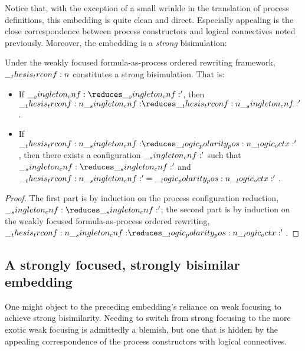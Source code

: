 Notice that, with the exception of a small wrinkle in the translation of process definitions, this embedding is quite clean and direct.
Especially appealing is the close correspondence between process constructors and logical connectives noted previously.
%
Moreover, the embedding is a \emph{strong} bisimulation:
%
\begin{theorem}
  Under the weakly focused formula-as-pro\-cess ordered rewriting framework, $\__thesis_trconf:n {}$ constitutes a strong bisimulation.
  That is:
  \begin{itemize}[nosep]
  \item If\/ $\cnf \reduces \cnf'$, then $\trconf{\cnf} \reduces \trconf{\cnf'}$.
  \item If\/ $\trconf{\cnf} \reduces \p{\octx'{}}$, then there exists a configuration $\__singleton_cnf:'$ such that $\cnf \reduces \cnf'$ and $\__thesis_trconf:n {\__singleton_cnf:'} = \__logic_polarity_pos:n {\__logic_octx:'{}}$.
  \end{itemize}
\end{theorem}
\begin{proof}
  The first part is by induction on the process configuration reduction, $\cnf \reduces \cnf'$; the second part is by induction on the weakly focused formula-as-process ordered rewriting, $\trconf{\cnf} \reduces \p{\octx'{}}$.
\end{proof}

\subsection{A strongly focused, strongly bisimilar embedding}\label{sec:embed:strong-focused-strong-bisim}

One might object to the preceding embedding's reliance on weak focusing to achieve strong bisimilarity.
Needing to switch from strong focusing to the more exotic weak focusing is admittedly a blemish, but one that is hidden by the appealing correspondence of the process constructors with logical connectives. 

